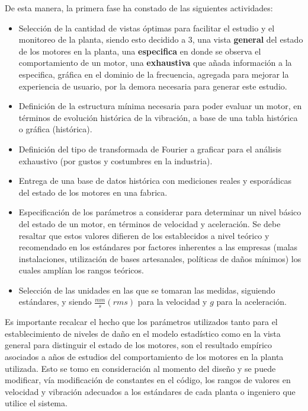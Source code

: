 De esta manera, la primera fase ha constado de las siguientes actividades:

\begin{itemize}
    \item Selección de la cantidad de vistas óptimas para facilitar el estudio
        y el monitoreo de la planta, siendo esto decidido a 3, una vista
        \textbf{general} del estado de los motores en la planta, una
        \textbf{especifica} en donde se observa el comportamiento de un motor,
        una \textbf{exhaustiva} que añada información a la especifica, gráfica en
        el dominio de la frecuencia, agregada para mejorar la experiencia de
        usuario, por la demora necesaria para generar este estudio.
    \item Definición de la estructura mínima necesaria para poder evaluar un
        motor, en términos de evolución histórica de la vibración, a base de
        una tabla histórica o gráfica (histórica).
    \item Definición del tipo de transformada de Fourier a graficar para el
        análisis exhaustivo (por gustos y costumbres en la industria).
    \item Entrega de una base de datos histórica con mediciones reales y esporádicas
        del estado de los motores en una fabrica.
    \item Especificación de los parámetros a considerar para determinar un nivel
        básico del estado de un motor, en términos de velocidad y aceleración.
        Se debe resaltar que estos valores difieren de los establecidos a nivel
        teórico y recomendado en los estándares por factores inherentes a las
        empresas (malas instalaciones,
        utilización de bases artesanales, políticas de daños mínimos) los cuales
        amplían los rangos teóricos.
    \item Selección de las unidades en las que se tomaran las medidas, siguiendo
        estándares, y siendo $\frac{mm}{s}(rms)$ para la velocidad y $g$ para la
        aceleración.
\end{itemize}

Es importante recalcar el hecho que los parámetros utilizados tanto
para el establecimiento de niveles de daño en el modelo estadístico como
en la vista general para distinguir el estado de los motores, son el resultado
empírico asociados a años de estudios del comportamiento de los motores en la
planta utilizada. Esto se tomo en consideración al momento del diseño y se puede
modificar, vía modificación de constantes en el código, los rangos de valores
en velocidad y vibración adecuados a los estándares de cada planta o ingeniero
que utilice el sistema.

